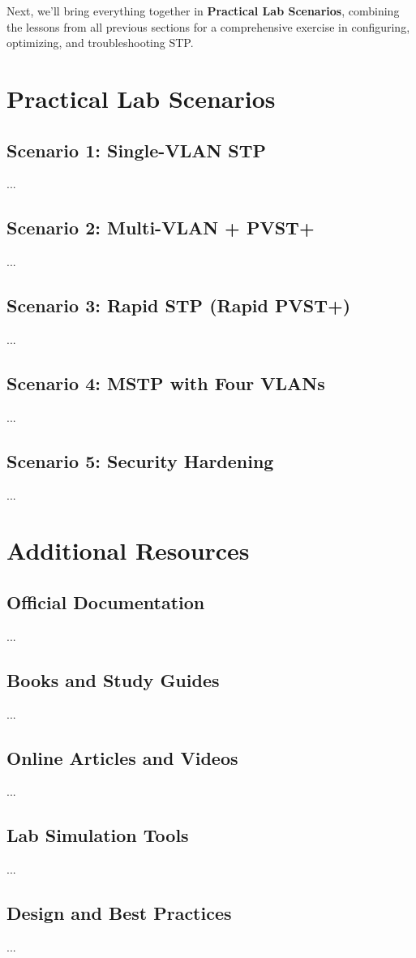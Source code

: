 \documentclass[a4paper]{report}
\begin{document}
Next, we’ll bring everything together in \textbf{Practical Lab Scenarios}, combining the lessons from all previous sections for a comprehensive exercise in configuring, optimizing, and troubleshooting STP.

\chapter{Practical Lab Scenarios}
\section{Scenario 1: Single-VLAN STP}
...

\section{Scenario 2: Multi-VLAN + PVST+}
...

\section{Scenario 3: Rapid STP (Rapid PVST+)}
...

\section{Scenario 4: MSTP with Four VLANs}
...

\section{Scenario 5: Security Hardening}
...

\chapter{Additional Resources}
\section{Official Documentation}
...

\section{Books and Study Guides}
...

\section{Online Articles and Videos}
...

\section{Lab Simulation Tools}
...

\section{Design and Best Practices}
...

\end{document}
